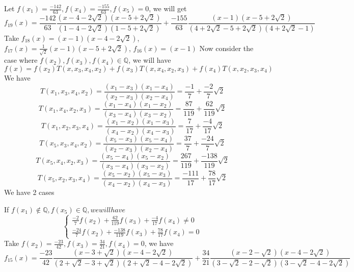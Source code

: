 \documentclass[english, 10pt]{article} %
\begin{document}
Let $f(x_1)=\frac{-142}{63}, f(x_4)=\frac{-155}{63}, f(x_5)=0$, we will get
$$f_{19}(x) = \frac{-142}{63} \frac{(x-4-2\sqrt{2})(x-5+2\sqrt{2})}{(1-4-2\sqrt{2})(1-5+2\sqrt{2})} + \frac{-155}{63} \frac{(x-1)(x-5+2\sqrt{2})}{(4+2\sqrt{2}-5+2\sqrt{2})(4+2\sqrt{2}-1)}$$
Take $f_{18}(x) = (x-1)(x-4-2\sqrt{2})$, $f_{17}(x) = \frac{1}{\sqrt{2}}(x-1)(x-5+2\sqrt{2})$, $f_{16}(x) = (x-1)$
Now consider the case where $f(x_2),f(x_3),f(x_4) \in \mathbb{Q}$, we will have
$$f(x) = f(x_2)T(x,x_3,x_4,x_2)+f(x_3)T(x,x_4,x_2,x_3)+f(x_4)T(x,x_2,x_3,x_4)$$
We have
$$T(x_1,x_3,x_4,x_2) = \frac{(x_1-x_3)(x_1-x_4)}{(x_2-x_3)(x_2-x_4)} = \frac{-1}{7}+\frac{-2}{7}\sqrt{2}$$
$$T(x_1,x_4,x_2,x_3) = \frac{(x_1-x_4)(x_1-x_2)}{(x_3-x_4)(x_3-x_2)} = \frac{87}{119}+\frac{62}{119}\sqrt{2}$$
$$T(x_1,x_2,x_3,x_4) = \frac{(x_1-x_2)(x_1-x_3)}{(x_4-x_2)(x_4-x_3)}= \frac{7}{17}+\frac{-4}{17}\sqrt{2}$$
$$T(x_5,x_3,x_4,x_2) = \frac{(x_5-x_3)(x_5-x_4)}{(x_2-x_3)(x_2-x_4)} = \frac{37}{7}+\frac{-24}{7}\sqrt{2}$$
$$T(x_5,x_4,x_2,x_3) = \frac{(x_5-x_4)(x_5-x_2)}{(x_3-x_4)(x_3-x_2)} = \frac{267}{119}+\frac{-138}{119}\sqrt{2}$$
$$T(x_5,x_2,x_3,x_4) = \frac{(x_5-x_2)(x_5-x_3)}{(x_4-x_2)(x_4-x_3)}= \frac{-111}{17}+\frac{78}{17}\sqrt{2}$$
We have 2 cases

If $f(x_1) \not \in \mathbb{Q}, f(x_5) \in \mathbb{Q}, we will have$
$$\begin{cases}
\frac{-2}{7}f(x_2)+\frac{62}{119}f(x_3)+\frac{-4}{17}f(x_4) \neq 0\\
\frac{-24}{7}f(x_2)+\frac{-138}{119}f(x_3)+\frac{78}{17}f(x_4) =0
\end{cases}$$
Take $f(x_2)=\frac{-23}{42},f(x_3)=\frac{34}{21},f(x_4) = 0$, we have
$$f_{15}(x) = \frac{-23}{42} \frac{(x-3+\sqrt{2})(x-4-2\sqrt{2})}{(2+\sqrt{2}-3+\sqrt{2})(2+\sqrt{2}-4-2\sqrt{2})} + \frac{34}{21} \frac{(x-2-\sqrt{2})(x-4-2\sqrt{2})}{(3-\sqrt{2}-2-\sqrt{2})(3-\sqrt{2}-4-2\sqrt{2})}$$
\end{document}
